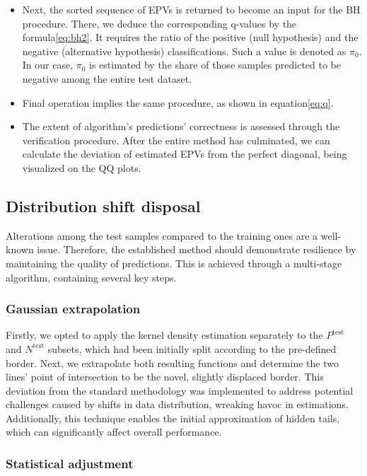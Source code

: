 \documentclass{article}
\begin{document}
\begin{enumerate}
\begin{itemize}
    \item Next, the sorted sequence of EPVs is returned to become an input for the BH procedure. There, we deduce the corresponding q-values by the formula\ref{eq:bh2}. It requires the ratio of the positive (null hypothesis) and the negative (alternative hypothesis) classifications. Such a value is denoted as $\pi_0$. In our case, $\pi_0$ is estimated by the share of those samples predicted to be negative among the entire test dataset. 
    \item Final operation implies the same procedure, as shown in equation\ref{eq:q}.
    \item The extent of algorithm's predictions' correctness is assessed through the verification procedure. After the entire method has culminated, we can calculate the deviation of estimated EPVs from the perfect diagonal, being visualized on the QQ plots. 
    \end{itemize}
\end{enumerate}

\subsection{Distribution shift disposal}\label{StatAd}

Alterations among the test samples compared to the training ones are a well-known issue. Therefore, the established method should demonstrate resilience by maintaining the quality of predictions. This is achieved through a multi-stage algorithm, containing several key steps.

\subsubsection{Gaussian extrapolation}

Firstly, we opted to apply the kernel density estimation separately to the $P^{\text{test}}$ and $N^{\text{test}}$ subsets, which had been initially split according to the pre-defined border. Next, we extrapolate both resulting functions and determine the two lines' point of intersection to be the novel, slightly displaced border. This deviation from the standard methodology was implemented to address potential challenges caused by shifts in data distribution, wreaking havoc in estimations. Additionally, this technique enables the initial approximation of hidden tails, which can significantly affect overall performance. 

\subsubsection{Statistical adjustment}
\end{document}
